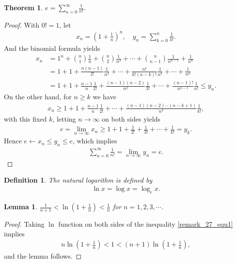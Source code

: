\documentclass[11pt]{book}
\newtheorem{definition}{Definition}[chapter]
\newtheorem{theorem}{Theorem}[chapter]
\newtheorem{lemma}{Lemma}[chapter]
\theoremstyle{definition}
\numberwithin{equation}{chapter}
\begin{document}
\medskip

\begin{theorem}
$\displaystyle e = \sum^\infty_{n=0} \frac{1}{n!}$.
\end{theorem}
\begin{proof}
With $0! = 1$, let
\begin{align*}
    x_n = \left(1 + \frac{1}{n}\right)^n, \quad y_n = \sum^n_{k=0} \frac{1}{k!}.
\end{align*}
And the binomial formula yields
\begin{align*}
    x_n & = 1^n + \binom{n}{1} \frac{1}{n} + \binom{n}{2} \frac{1}{n^2} + \cdots + \binom{n}{n-1} \frac{1}{n^{n-1}} + \frac{1}{n^n} \\
    & = 1 + 1 + \frac{n(n-1)}{2!} \frac{1}{n^2} + \cdots + \frac{n!}{k!(n-k)!} \frac{1}{n^k} + \cdots + \frac{1}{n^n} \\
    & = 1 + 1 + \frac{n-1}{n} \frac{1}{2!} + \frac{(n-1)(n-2)}{n^2} \frac{1}{3!} + \cdots + \frac{(n-1)!}{n^{n-1}} \frac{1}{n!} \leq y_n.
\end{align*}
On the other hand, for $n \geq k$ we have
\begin{align*}
    x_n \geq 1 + 1 + \frac{n-1}{n} \frac{1}{2!} + \cdots + \frac{(n-1)(n-2)\cdots(n-k+1)}{n^k} \frac{1}{k!},
\end{align*}
with this fixed $k$, letting $n\to\infty$ on both sides yields
\begin{align*}
    e = \lim_{n\to\infty} x_n \geq 1 + 1 + \frac{1}{2!} + \frac{1}{3!} + \cdots + \frac{1}{k!} = y_k.
\end{align*}
Hence $e \leftarrow x_n \leq y_n \leq e$, which implies
\begin{align*}
    \sum^\infty_{n=0} \frac{1}{n!} = \lim_{n\to\infty} y_n = e.
\end{align*}
\end{proof}

\medskip

\begin{definition}
The natural logarithm is defined by
\begin{align*}
    \ln x = \log x = \log_e x.
\end{align*}
\end{definition}

\medskip

\begin{lemma}
$\displaystyle \frac{1}{n + 1} < \ln \left(1 + \frac{1}{n}\right) < \frac{1}{n}$ for $n = 1,2,3,\cdots$.
\end{lemma}
\begin{proof}
Taking $\ln$ function on both sides of the inequality \eqref{remark_27_equ1} implies 
\begin{align*}
    n \ln\left(1 + \frac{1}{n}\right) < 1 < (n+1) \ln \left(1 + \frac{1}{n}\right),
\end{align*}
and the lemma follows.
\end{proof}
\end{document}
